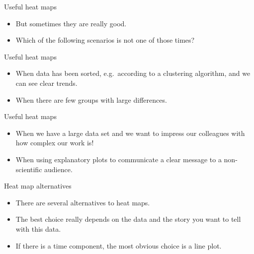 \documentclass[
  ignorenonframetext,
]{beamer}
\begin{document}
\begin{frame}{Useful heat maps}
\label{useful-heat-maps-1}
\begin{itemize}
\item
  But sometimes they are really good.
\item
  Which of the following scenarios is not one of those times?
\end{itemize}
\end{frame}

\begin{frame}{Useful heat maps}
\label{useful-heat-maps-2}
\begin{itemize}
\item
  When data has been sorted, e.g.~according to a clustering algorithm,
  and we can see clear trends.
\item
  When there are few groups with large differences.
\end{itemize}
\end{frame}

\begin{frame}{Useful heat maps}
\label{useful-heat-maps-3}
\begin{itemize}
\item
  When we have a large data set and we want to impress our colleagues
  with how complex our work is!
\item
  When using explanatory plots to communicate a clear message to a
  non-scientific audience.
\end{itemize}
\end{frame}

\begin{frame}{Heat map alternatives}
\label{heat-map-alternatives}
\begin{itemize}
\item
  There are several alternatives to heat maps.
\item
  The best choice really depends on the data and the story you want to
  tell with this data.
\item
  If there is a time component, the most obvious choice is a line plot.
\end{itemize}
\end{frame}
\end{document}
